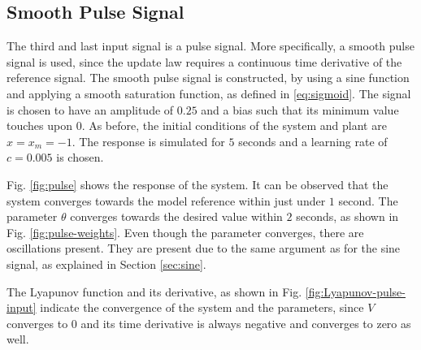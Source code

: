 \subsection{Smooth Pulse Signal}
The third and last input signal is a pulse signal. More specifically, a smooth pulse signal is used, since the update law requires a continuous time derivative of the reference signal. The smooth pulse signal is constructed, by using a sine function and applying a smooth saturation function, as defined in \eqref{eq:sigmoid}. The signal is chosen to have an amplitude of $0.25$ and a bias such that its minimum value touches upon $0$. As before, the initial conditions of the system and plant are $x=x_m=-1$. The response is simulated for $5$ seconds and a learning rate of $c=0.005$ is chosen.

Fig. \ref{fig:pulse} shows the response of the system. It can be observed that the system converges towards the model reference within just under $1$ second. The parameter $\theta$ converges towards the desired value within $2$ seconds, as shown in Fig. \ref{fig:pulse-weights}. Even though the parameter converges, there are oscillations present. They are present due to the same argument as for the sine signal, as explained in Section \ref{sec:sine}.

The Lyapunov function and its derivative, as shown in Fig. \ref{fig:Lyapunov-pulse-input} indicate the convergence of the system and the parameters, since $V$ converges to $0$ and its time derivative is always negative and converges to zero as well.

